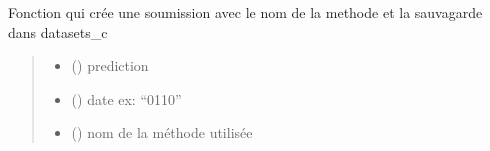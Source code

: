 \documentclass[letterpaper,10pt,french]{sphinxmanual}
\begin{document}

\begin{fulllineitems}
\label{\detokenize{general:general.soumission}}
\pysigstartsignatures
{}
\pysigstopsignatures
\sphinxAtStartPar
Fonction qui crée une soumission avec le nom de la methode et la sauvagarde dans datasets\_c
\begin{quote}\begin{description}
\begin{itemize}
\item {} 
\sphinxAtStartPar
{} () \textendash{} prediction

\item {} 
\sphinxAtStartPar
{} () \textendash{} date ex: “0110”

\item {} 
\sphinxAtStartPar
{} () \textendash{} nom de la méthode utilisée

\end{itemize}

\end{description}\end{quote}

\end{fulllineitems}

\end{document}
